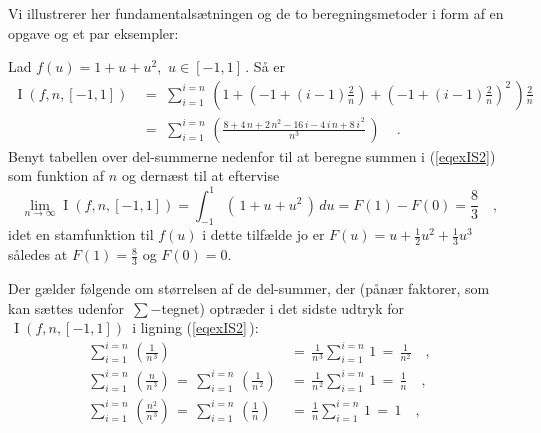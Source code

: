Vi illustrerer her fundamentalsætningen og de to beregningsmetoder i form af en opgave og et par eksempler:






\begin{exercise} \label{exIS2}
Lad $f(u) = 1 + u + u^{2}$, $\,u \in [-1, 1]\,$. Så er
\begin{equation}\label{eqexIS2}
\begin{aligned}
\operatorname{I}(f,n, [-1,1]) \, & = \, \,  \sum_{i=1}^{i=n}\, \left(1 +
\left(-1+ (i-1)\frac{2}{n}\right) + \left(-1+
(i-1)\frac{2}{n}\right)^{2}
\,\right)\frac{2}{n} \\
 & = \, \, \sum_{i=1}^{i=n}\, \left(\frac{ 8 + 4\,n + 2\,n^{2} - 16\,i - 4\,i\,n + 8\,i^{\,2}}{n^{3}}\,\right) \,
  \quad .
\end{aligned}
\end{equation}
Benyt tabellen over del-summerne nedenfor til at beregne summen i (\ref{eqexIS2}) som funktion af $n$ og
dernæst til at eftervise
\begin{equation}\label{eqexIS2B}
\lim_{n \to \infty} \operatorname{I}(f,n, [-1,1]) = \int_{-1}^{1}
\left(\,1+u+u^{2}\,\right)\, du = F(1) - F(0) = \frac{8}{3}
 \quad ,
\end{equation}
idet en stamfunktion til $f(u)$ i dette tilfælde jo er $F(u) = u + \frac{1}{2}u^{2} + \frac{1}{3}u^{3}$ således at
$F(1) = \frac{8}{3}$ og $F(0) = 0$.

Der
gælder følgende om størrelsen af de del-summer,
der (pånær faktorer, som kan sættes udenfor
$\,\sum-$tegnet) optræder i det sidste udtryk for
$\, \operatorname{I}(f,n, [-1,1])\,$ i ligning
(\ref{eqexIS2}\,):
\begin{equation}\label{eqSummings1}
\begin{aligned}
\sum_{i=1}^{i=n}\, \left(\frac{1}{n^{\,3}}\right) \, &= \, \frac{1}{n^{\,3}}\sum_{i=1}^{i=n}\,1 \, = \, \frac{1}{n^{2}}  \quad ,\\
\sum_{i=1}^{i=n}\, \left(\frac{n}{n^{\,3}}\right) \,=\, \sum_{i=1}^{i=n}\, \left(\frac{1}{n^{\,2}}\right)\, &= \, \frac{1}{n^{\,2}}\sum_{i=1}^{i=n}\,1  \, = \,  \frac{1}{n} \quad ,\\
\sum_{i=1}^{i=n}\, \left(\frac{n^2}{n^{\,3}}\right) \,= \, \sum_{i=1}^{i=n}\, \left(\frac{1}{n}\right) \, &= \, \frac{1}{n}\sum_{i=1}^{i=n}\,1  \, = \, 1  \quad , \\ \\
\end{aligned}
\end{equation}



\end{exercise}
